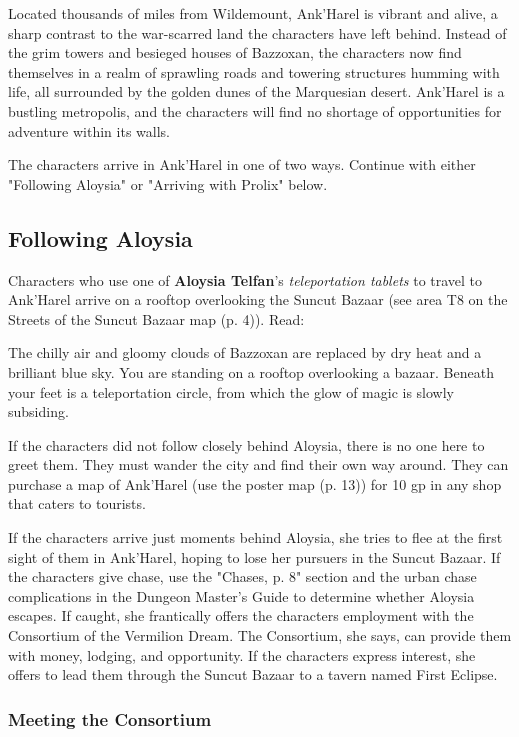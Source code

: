 \documentclass[a4paper, 11pt, bg=full, twocolumn, nooutline]{dndbook}
\begin{document}
Located thousands of miles from Wildemount, Ank'Harel is vibrant and alive, a sharp contrast to the war-scarred land the characters have left behind. Instead of the grim towers and besieged houses of Bazzoxan, the characters now find themselves in a realm of sprawling roads and towering structures humming with life, all surrounded by the golden dunes of the Marquesian desert. Ank'Harel is a bustling metropolis, and the characters will find no shortage of opportunities for adventure within its walls.

The characters arrive in Ank'Harel in one of two ways. Continue with either "Following Aloysia" or "Arriving with Prolix" below.

\subsection{Following Aloysia}

Characters who use one of \textbf{Aloysia Telfan}'s \textit{teleportation tablets} to travel to Ank'Harel arrive on a rooftop overlooking the Suncut Bazaar (see area T8 on the Streets of the Suncut Bazaar map (p. 4)). Read:

\begin{DndReadAloud}
The chilly air and gloomy clouds of Bazzoxan are replaced by dry heat and a brilliant blue sky. You are standing on a rooftop overlooking a bazaar. Beneath your feet is a teleportation circle, from which the glow of magic is slowly subsiding.
\end{DndReadAloud}

If the characters did not follow closely behind Aloysia, there is no one here to greet them. They must wander the city and find their own way around. They can purchase a map of Ank'Harel (use the poster map (p. 13)) for 10 gp in any shop that caters to tourists.

If the characters arrive just moments behind Aloysia, she tries to flee at the first sight of them in Ank'Harel, hoping to lose her pursuers in the Suncut Bazaar. If the characters give chase, use the "Chases, p. 8" section and the urban chase complications in the Dungeon Master's Guide to determine whether Aloysia escapes. If caught, she frantically offers the characters employment with the Consortium of the Vermilion Dream. The Consortium, she says, can provide them with money, lodging, and opportunity. If the characters express interest, she offers to lead them through the Suncut Bazaar to a tavern named First Eclipse.

\subsubsection{Meeting the Consortium}
\end{document}
